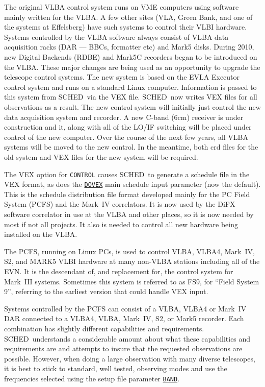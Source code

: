 \documentclass{report}
\newcommand{\schedb}{{\sc SCHED~}}
\begin{document}
The original VLBA control system runs on VME computers using software
mainly written for the VLBA.  A few other sites (VLA, Green Bank, and
one of the systems at Effelsberg) have such systems to control their
VLBI hardware.  Systems controlled by the VLBA software always consist
of VLBA data acquisition racks (DAR --- BBCs, formatter etc) and Mark5
disks.  During 2010, new Digital Backends (RDBE) and Mark5C recorders
began to be introduced on the VLBA.  These major changes are being
used as an opportunity to upgrade the telescope control systems.  The
new system is based on the EVLA Executor control system and runs on a
standard Linux computer.  Information is passed to this system from
\schedb via the VEX file.  \schedb now writes VEX files for all
observations as a result.  The new control system will initially just
control the new data acquisition system and recorder.  A new C-band
(6cm) receiver is under construction and it, along with all of the
LO/IF switching will be placed under control of the new computer.
Over the course of the next few years, all VLBA systems will be moved
to the new control.  In the meantime, both crd files for the old
system and VEX files for the new system will be required.

The VEX option for {\tt CONTROL} causes \schedb to generate a schedule
file in the VEX format, as does the 
{\hyperref[MP:DOVEX]{{\tt DOVEX}}}
main schedule input parameter (now the default).  This is the schedule
distribution file format developed mainly for the PC Field System
(PCFS) and the Mark~IV correlators.  It is now used by the DiFX
software correlator in use at the VLBA and other places, so it is
now needed by most if not all projects.  It also is needed to control
all new hardware being installed on the VLBA.

The PCFS, running on Linux PCs, is used to control VLBA,
VLBA4, Mark~IV, S2, and MARK5 VLBI hardware at many non-VLBA stations
including all of the EVN.  It is the descendant of, and replacement
for, the control system for Mark~III systems.  Sometimes this system
is referred to as FS9, for ``Field System 9'', referring to the earliest
version that could handle VEX input.

Systems controlled by the PCFS can consist of a VLBA, VLBA4 or Mark~IV
DAR connected to a VLBA4, VLBA, Mark~IV, S2, or Mark5 recorder.  Each
combination has slightly different capabilities and requirements.
\schedb understands a considerable amount about what these
capabilities and requirements are and attempts to insure that the
requested observations are possible.  However, when doing a large
observation with many diverse telescopes, it is best to stick to
standard, well tested, observing modes and use the frequencies
selected using the setup file parameter 
{\hyperref[SP:BAND]{{\tt BAND}}}.
\end{document}
